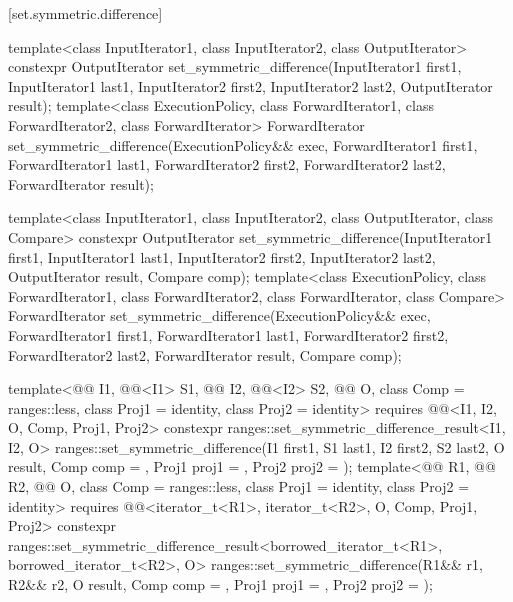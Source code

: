 [set.symmetric.difference]{}

%
\begin{itemdecl}
template<class InputIterator1, class InputIterator2,
         class OutputIterator>
  constexpr OutputIterator
    set_symmetric_difference(InputIterator1 first1, InputIterator1 last1,
                             InputIterator2 first2, InputIterator2 last2,
                             OutputIterator result);
template<class ExecutionPolicy, class ForwardIterator1, class ForwardIterator2,
         class ForwardIterator>
  ForwardIterator
    set_symmetric_difference(ExecutionPolicy&& exec,
                             ForwardIterator1 first1, ForwardIterator1 last1,
                             ForwardIterator2 first2, ForwardIterator2 last2,
                             ForwardIterator result);

template<class InputIterator1, class InputIterator2,
         class OutputIterator, class Compare>
  constexpr OutputIterator
    set_symmetric_difference(InputIterator1 first1, InputIterator1 last1,
                             InputIterator2 first2, InputIterator2 last2,
                             OutputIterator result, Compare comp);
template<class ExecutionPolicy, class ForwardIterator1, class ForwardIterator2,
         class ForwardIterator, class Compare>
  ForwardIterator
    set_symmetric_difference(ExecutionPolicy&& exec,
                             ForwardIterator1 first1, ForwardIterator1 last1,
                             ForwardIterator2 first2, ForwardIterator2 last2,
                             ForwardIterator result, Compare comp);

template<@@ I1, @@<I1> S1, @@ I2, @@<I2> S2,
         @@ O, class Comp = ranges::less,
         class Proj1 = identity, class Proj2 = identity>
  requires @@<I1, I2, O, Comp, Proj1, Proj2>
  constexpr ranges::set_symmetric_difference_result<I1, I2, O>
    ranges::set_symmetric_difference(I1 first1, S1 last1, I2 first2, S2 last2, O result,
                                     Comp comp = {}, Proj1 proj1 = {},
                                     Proj2 proj2 = {});
template<@@ R1, @@ R2, @@ O,
         class Comp = ranges::less, class Proj1 = identity, class Proj2 = identity>
  requires @@<iterator_t<R1>, iterator_t<R2>, O, Comp, Proj1, Proj2>
  constexpr ranges::set_symmetric_difference_result<borrowed_iterator_t<R1>,
                                                    borrowed_iterator_t<R2>, O>
    ranges::set_symmetric_difference(R1&& r1, R2&& r2, O result, Comp comp = {},
                                     Proj1 proj1 = {}, Proj2 proj2 = {});


\end{itemdecl}

